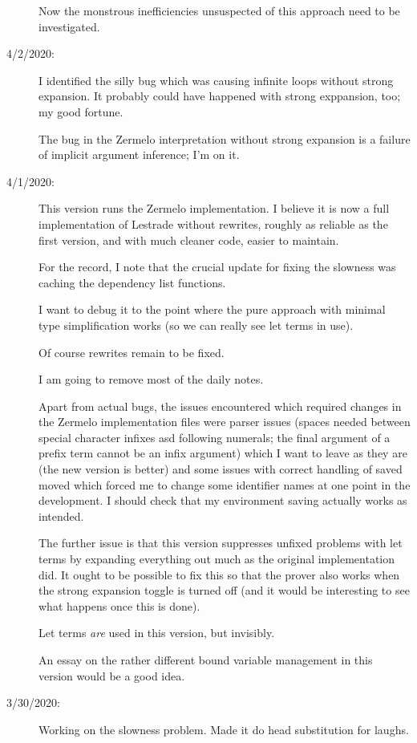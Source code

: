 \documentclass[12pt]{article}
\begin{document}
\begin{description}
Now the monstrous inefficiencies unsuspected of this approach need to be investigated.

\item[4/2/2020:]  I identified the silly bug which was causing infinite loops without strong expansion.  It probably
could have happened with strong exppansion, too;  my good fortune.

The bug in the Zermelo interpretation without strong expansion is a failure of implicit argument inference;  I'm on it.

\item[4/1/2020:]  This version runs the Zermelo implementation.  I believe it is now a full implementation of Lestrade without rewrites, roughly
as reliable as the first version, and with much cleaner code, easier to maintain.

For the record, I note that the crucial update for fixing the slowness was caching the dependency list functions.

I want to debug it to the point where the pure approach with minimal type simplification works (so we can really
see let terms in use).

Of course rewrites remain to be fixed.

I am going to remove most of the daily notes.

Apart from actual bugs, the issues encountered which required changes in the Zermelo implementation files were parser issues (spaces needed between special character infixes asd following numerals;  the final argument of a prefix term cannot be an infix argument) which I want to leave as they are (the new version is better) and some issues with
correct handling of saved moved which forced me to change some identifier names at one point in the development.  I should check that my environment saving actually works as intended.

The further issue is that this version suppresses unfixed problems with let terms by expanding everything out much as the original implementation did.  It ought to be possible to fix this so that the prover also works when the strong expansion toggle is turned off (and it would be interesting to see what happens once this is done).

Let terms {\em are\/} used in this version, but invisibly.

An essay on the rather different bound variable management in this version would be a good idea.

\item[3/30/2020:]  Working on the slowness problem.  Made it do head substitution for laughs.


\end{description}
\end{document}
